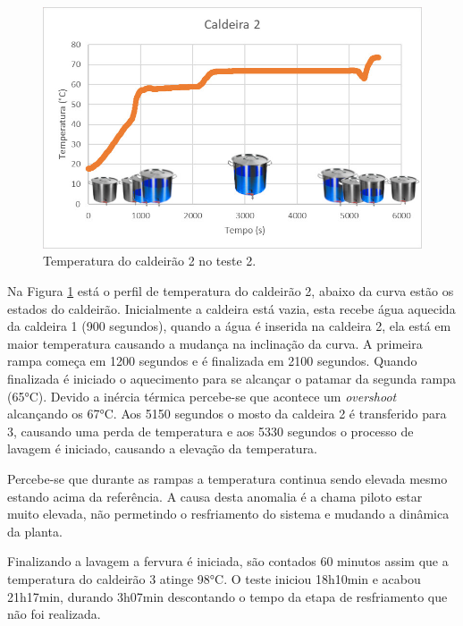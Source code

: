   \begin{figure}[htb]
	\caption{\label{teste02c2}Temperatura do caldeirão 2 no teste 2.}
	\begin{center}
	    \includegraphics[width=0.95\linewidth]{./img/teste02.jpg}
	\end{center}
\end{figure}


Na Figura \ref{teste02c2} está o perfil de temperatura do caldeirão 2, abaixo da curva estão os estados do caldeirão. Inicialmente a caldeira está vazia, esta recebe água aquecida da caldeira 1 (900 segundos), quando a água é inserida na caldeira 2, ela está em maior temperatura causando a mudança na inclinação da curva. A primeira rampa começa em 1200 segundos e é finalizada em 2100 segundos. Quando finalizada é iniciado o aquecimento para se alcançar o patamar da segunda rampa (65°C). Devido a inércia térmica percebe-se que acontece um \textit{overshoot} alcançando os 67°C. Aos 5150 segundos o mosto da caldeira 2 é transferido para 3, causando uma perda de temperatura e aos 5330 segundos o processo de lavagem é iniciado, causando a elevação da temperatura.

Percebe-se que durante as rampas a temperatura continua sendo elevada mesmo estando acima da referência. A causa desta anomalia é a chama piloto estar muito elevada, não permetindo o resfriamento do sistema e mudando a dinâmica da planta.


Finalizando a lavagem a fervura é iniciada, são contados 60 minutos assim que a temperatura do caldeirão 3 atinge 98°C. O teste iniciou 18h10min e acabou 21h17min, durando 3h07min descontando o tempo da etapa de resfriamento que não foi realizada. 

